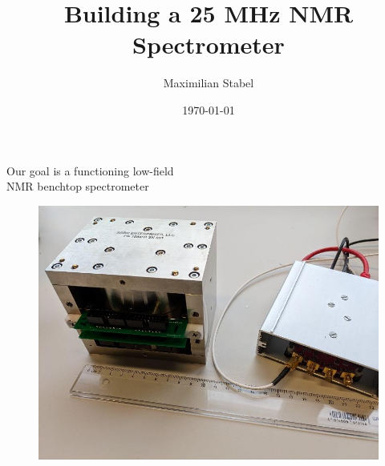 \documentclass[aspectratio=169]{beamer}
\title{Building a 25 MHz NMR Spectrometer}
\date{\today}
\author{Maximilian Stabel}
\institute{ETH Zürich}
\begin{document}
  \maketitle
  \begin{frame}{Our goal is a functioning low-field\\NMR benchtop spectrometer}
    \begin{figure}
      \centering
      \includegraphics[width=\textwidth,height=0.8\textheight,keepaspectratio]{./img/magnet.png}
    \end{figure}
  \end{frame}
\end{document}
